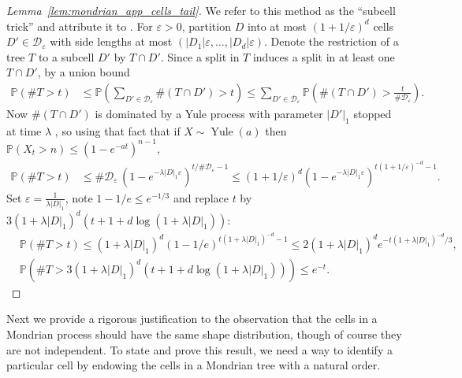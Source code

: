 \documentclass[11pt,lof]{puthesis}
\renewcommand{\P}{\ensuremath{\mathbb{P}}}
\newcommand{\cD}{\ensuremath{\mathcal{D}}}
\DeclareMathOperator{\Yule}{Yule}
\theoremstyle{break}
\theoremstyle{proof}
\newtheorem{proof}{Proof}
\begin{document}
\begin{proof}[Lemma~\ref{lem:mondrian_app_cells_tail}]

  We refer to this method as the ``subcell trick''
  and attribute it to \citet{mourtada2017universal}.
  For $\varepsilon > 0$, partition $D$ into
  at most $(1 + 1/\varepsilon)^d$ cells $D' \in \cD_\varepsilon$
  with side lengths at most $(|D_1| \varepsilon, \ldots, |D_d| \varepsilon)$.
  Denote the restriction of a tree $T$ to a subcell $D'$ by $T \cap D'$.
  Since a split in $T$ induces a split in at least one $T \cap D'$,
  by a union bound
  \begin{align*}
    \P\left(\# T > t \right)
    &\leq
    \P\left(\sum_{D' \in \cD_\varepsilon}
    \# (T \cap D') > t \right)
    \leq
    \sum_{D' \in \cD_\varepsilon}
    \P\left(
      \# (T \cap D') >
      \frac{t}{\# \cD_\varepsilon}
    \right).
  \end{align*}
  Now $\# (T \cap D')$ is dominated by a Yule process
  with parameter $|D'|_1$ stopped at time $\lambda$
  \citep[proof of Lemma~2]{mourtada2017universal},
  so using that fact that if
  $X \sim \Yule(a)$
  then $\P(X_t > n) \leq (1-e^{-at})^{n-1}$,
  \begin{align*}
    \P\left(\# T > t \right)
    &\leq
    \# \cD_\varepsilon \,
    (1 - e^{-\lambda |D|_1 \varepsilon})^{t / \# \cD_\varepsilon - 1}
    \leq
    (1 + 1/\varepsilon)^d
    (1 - e^{-\lambda |D|_1 \varepsilon})^{t (1 + 1/\varepsilon)^{-d} - 1}.
  \end{align*}
  Set $\varepsilon = \frac{1}{\lambda |D|_1}$,
  note $1-1/e \leq e^{-1/3}$
  and replace $t$ by
  $3 (1 + \lambda |D|_1)^d
  (t + 1 + d \log(1 + \lambda |D|_1))$:
  \begin{align*}
    &\P\left(\# T > t \right)
    \leq
    (1 + \lambda |D|_1)^d
    (1 - 1/e)^{t (1 + \lambda |D|_1)^{-d} - 1}
    \leq
    2 (1 + \lambda |D|_1)^d
    e^{-t (1 + \lambda |D|_1)^{-d} / 3}, \\
    &\P\left(\# T >
      3
      (1 + \lambda |D|_1)^d
      (t + 1 + d \log(1 + \lambda |D|_1))
    \right)
    \leq
    e^{-t}.
  \end{align*}
\end{proof}

Next we provide a rigorous justification to the observation that the cells
in a Mondrian process should have the same shape distribution, though
of course they are not independent. To state and prove this result,
we need a way to identify a particular cell by endowing the
cells in a Mondrian tree with a natural order.
\end{document}

